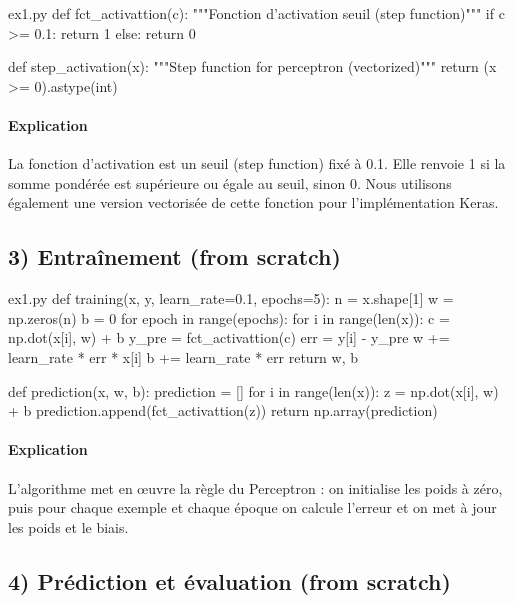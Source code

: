 \documentclass[12pt,a4paper]{article}
\begin{document}
\begin{codeholder}{ex1.py}
def fct_activattion(c):
    """Fonction d'activation seuil (step function)"""
    if c >= 0.1:
        return 1
    else:
        return 0

def step_activation(x):
    """Step function for perceptron (vectorized)"""
    return (x >= 0).astype(int)
\end{codeholder}

\paragraph{Explication}
La fonction d'activation est un seuil (step function) fixé à 0.1.
Elle renvoie 1 si la somme pondérée est supérieure ou égale au seuil, sinon 0.
Nous utilisons également une version vectorisée de cette fonction pour l'implémentation Keras.


\subsection*{3) Entraînement (from scratch)}

\begin{codeholder}{ex1.py}
def training(x, y, learn_rate=0.1, epochs=5):
    n = x.shape[1]
    w = np.zeros(n)
    b = 0
    for epoch in range(epochs):
        for i in range(len(x)):
            c = np.dot(x[i], w) + b
            y_pre = fct_activattion(c)
            err = y[i] - y_pre
            w += learn_rate * err * x[i]
            b += learn_rate * err
    return w, b

def prediction(x, w, b):
    prediction = []
    for i in range(len(x)):
        z = np.dot(x[i], w) + b
        prediction.append(fct_activattion(z))
    return np.array(prediction)
\end{codeholder}

\paragraph{Explication}
L'algorithme met en œuvre la règle du Perceptron : on initialise les poids
à zéro, puis pour chaque exemple et chaque époque on calcule l'erreur
et on met à jour les poids et le biais.


\subsection*{4) Prédiction et évaluation (from scratch)}
\end{document}
